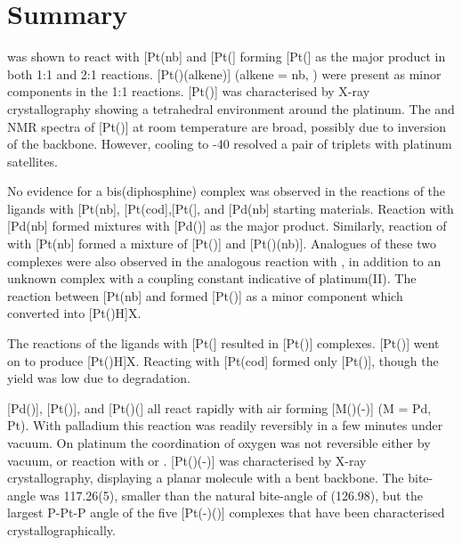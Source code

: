 
\section{Summary}

\PhThixantphos{} was shown to react with [Pt(nb] and [Pt(] forming [Pt(\Phthixantphos{}] as the major product in both 1:1 and 2:1 reactions. [Pt(\Phthixantphos)(alkene)] (alkene = nb, ) were present as minor components in the 1:1 reactions.  [Pt(\Phthixantphos)] was characterised by X-ray crystallography showing a tetrahedral environment around the platinum.  The \proton{} and \phosphorus{} NMR spectra of [Pt(\Phthixantphos)] at room temperature are broad, possibly due to inversion of the backbone.  However, cooling to -40\degC{}  resolved a pair of triplets with platinum satellites.  

No evidence for a bis(diphosphine) complex was observed in the reactions of the \tBuxantphos{} ligands with [Pt(nb], [Pt(cod],[Pt(], and [Pd(nb] starting materials.  Reaction with [Pd(nb] formed mixtures with [Pd(\tBuxantphos)] as the major product.  Similarly, reaction of \tButhixantphos{} with [Pt(nb] formed a mixture of [Pt(\tButhixantphos)] and [Pt(\tButhixantphos)(nb)].  Analogues of these two complexes were also observed in the analogous reaction with \tBusixantphos{}, in addition to an unknown complex with a coupling constant indicative of platinum(II).  The reaction between [Pt(nb] and \tBuxantphos{} formed [Pt(\tBuxantphos)] as a minor component which converted into [Pt(\tBuxantphos)H]X.  

The reactions of the \tBuxantphos{} ligands with [Pt(] resulted in [Pt(\tBuxantphos)] complexes.  [Pt(\tBuxantphos)] went on to produce [Pt(\tBuxantphos)H]X.  Reacting \tButhixantphos{} with [Pt(cod] formed only [Pt(\tButhixantphos)], though the yield was low due to degradation.

[Pd(\tButhixantphos)], [Pt(\tButhixantphos)], and [Pt(\tButhixantphos)(] all react rapidly with air forming [M(\tButhixantphos)(-)] (M = Pd, Pt).  With palladium this reaction was readily reversibly in a few minutes under vacuum.  On platinum the coordination of oxygen was not reversible either by vacuum, or reaction with  or .  [Pt(\tButhixantphos)(-)] was characterised by X-ray crystallography, displaying a planar molecule with a bent \tButhixantphos{} backbone.  The bite-angle was 117.26(5), smaller than the natural bite-angle of (126.98\degrees{}), but the largest P-Pt-P angle of the five [Pt(-)()] complexes that have been characterised crystallographically.  

